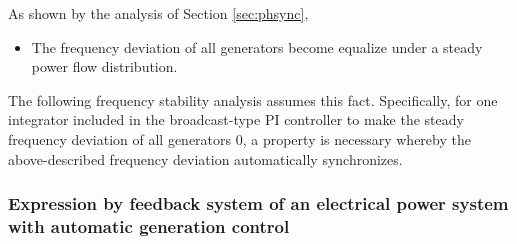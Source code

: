 \documentclass[graybox, envcountchap]{svmult}
\begin{document}
As shown by the analysis of Section \ref{sec:phsync},
\begin{itemize}
\item The frequency deviation of all generators become equalize under a steady power flow distribution.
\end{itemize}
The following frequency stability analysis assumes this fact.
Specifically, for one integrator included in the broadcast-type PI controller to make the steady frequency deviation of all generators 0, a property is necessary whereby the above-described frequency deviation automatically synchronizes.

\smallskip
\subsubsection{Expression by feedback system of an electrical power system with automatic generation control}
\end{document}
